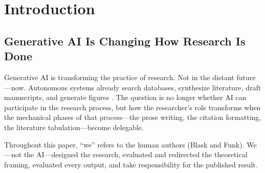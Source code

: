 \documentclass{article}
\begin{document}
\begin{abstract}
This position paper argues that generative AI is triggering a structural shift in knowledge work: from \textit{creator} to \textit{orchestrator}. To substantiate this argument, we present the \textit{Open Paper Machine}, an autonomous LLM-based research agent built on Claude Opus 4.6 and the Model Context Protocol, which executed the full academic pipeline---literature search, theoretical framing, drafting, figure generation, and \LaTeX{} compilation---producing this manuscript. Drawing on distributed cognition \citep{hutchins1995cognition}, sociotechnical systems theory \citep{trist1951social}, and the task-based automation framework \citep{autor2015why}, we interpret what this demonstration means. The central argument: the researcher's role is likely to shift from producing text to directing, evaluating, and taking accountability for AI-generated output. If the process of desk research---literature reviews, theoretical syntheses, structured argumentation---becomes largely automatable, then process alone is no longer a contribution. This might increasingly bring science back to what it always should have been: the generation of genuinely new knowledge.
\end{abstract}

\section{Introduction}

\subsection{Generative AI Is Changing How Research Is Done}

Generative AI is transforming the practice of research. Not in the distant future---now. Autonomous systems already search databases, synthesize literature, draft manuscripts, and generate figures \citep{yamada2025scientist,ifargan2024autonomous,asai2024openscholar,zheng2025automation}. The question is no longer whether AI can participate in the research process, but how the researcher's role transforms when the mechanical phases of that process---the prose writing, the citation formatting, the literature tabulation---become delegable.

Throughout this paper, ``we'' refers to the human authors (Blask and Funk). We---not the AI---designed the research, evaluated and redirected the theoretical framing, evaluated every output, and take responsibility for the published result.
\end{document}
